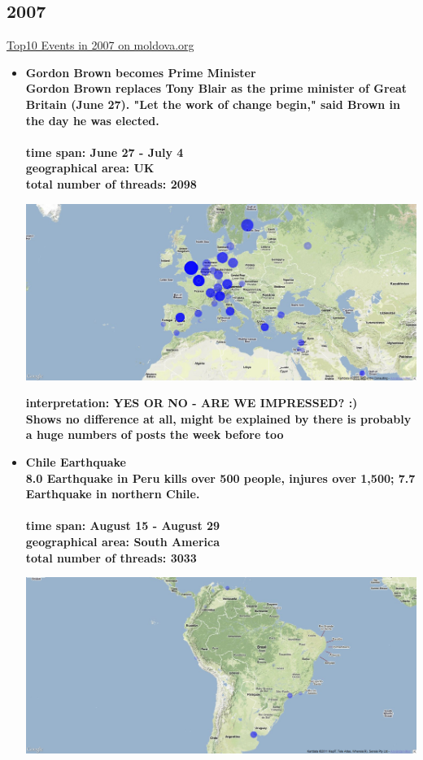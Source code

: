 \documentclass[11pt,a4paper,english]{article}
\begin{document}
			\subsection{2007}
			\href{http://social.moldova.org/news/10-most-important-world-events-of-2007-217388-eng.html}{Top10 Events in 2007 on moldova.org}
				\begin{itemize}
					\item \bf Gordon Brown becomes Prime Minister \rm
						\\ Gordon Brown replaces Tony Blair as the prime minister of Great Britain (June 27). "Let the work of change begin," said Brown in the day he was elected.
						\\\\ \bf time span: \rm June 27 - July 4
						\\ \bf geographical area: \rm UK
						\\ \bf total number of threads: \rm 2098
					
						\includegraphics[width=130mm]{img/post-gordon}
						
						\bf interpretation: \rm YES OR NO - ARE WE IMPRESSED? :)
						\\ Shows no difference at all, might be explained by there is probably a huge numbers of posts the week before too
						
						
						
					\item \bf Chile Earthquake \rm
						\\ 8.0 Earthquake in Peru kills over 500 people, injures over 1,500; 7.7 Earthquake in northern Chile.
						\\\\ \bf time span: \rm August 15 - August 29
						\\ \bf geographical area: \rm South America
						\\ \bf total number of threads: \rm 3033
					
						\includegraphics[width=130mm]{img/post-chile}
						

\end{itemize}
\end{document}
